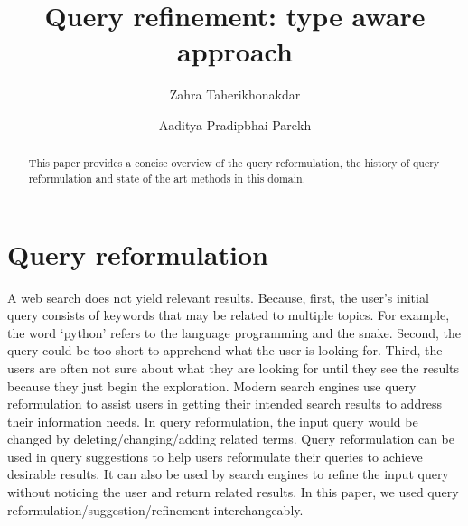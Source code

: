 \documentclass[sigconf]{acmart}
\begin{document}
\title{Query refinement: type aware approach}
\author{Zahra Taherikhonakdar}
\author{Aaditya Pradipbhai Parekh}
\begin{abstract}
This paper provides a concise overview of the query reformulation, the history of query reformulation and state of the art methods in this domain.
\end{abstract}
\vspace{-7pt}
\maketitle

\vspace{-3pt}
\section{Query reformulation}
A web search does not yield relevant results. Because, first, the user’s initial query consists of keywords that may be related to multiple topics. For example, the word ‘python’ refers to the language programming and the snake. Second, the query could be too short to apprehend what the user is looking for. Third, the users are often not sure about what they are looking for until they see the results because they just begin the exploration. Modern search engines use query reformulation to assist users in getting their intended search results to address their information needs. In query reformulation, the input query would be changed by deleting/changing/adding related terms. Query reformulation can be used in query suggestions to help users reformulate their queries to achieve desirable results. It can also be used by search engines to refine the input query without noticing the user and return related results. In this paper, we used query reformulation/suggestion/refinement interchangeably.  
\vspace{-3pt}
\end{document}
